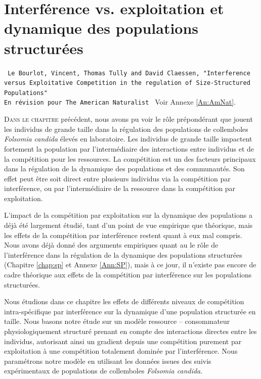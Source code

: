 \chapter[Interférence vs. exploitation et dynamique des populations
structurées][Interférence et populations structurées]{Interférence vs.
exploitation et dynamique des populations structurées}
\label{chap:amnat}

\vspace{2cm}
\begin{Spacing}{1}
\texttt{
Le Bourlot, Vincent, Thomas Tully and David Claessen, "Interference versus
Exploitative Competition in the regulation of Size-Structured Populations"\\
En révision pour The American Naturalist
}
Voir Annexe \ref{An:AmNat}.
\end{Spacing}
\vspace{2cm}


\lettrine[lines=3]{D}{ans le chapitre} précédent, nous avons pu voir le rôle
prépondérant que jouent les individus de grande taille dans la régulation des
populations de collemboles \textit{Folsomia candida} élevés en laboratoire. Les
individus de grande taille impactent fortement la population par l'intermédiaire
des interactions entre individus et de la compétition pour les ressources. La
compétition est un des facteurs principaux dans la régulation de la dynamique
des populations et des communautés. Son effet peut être soit direct entre
plusieurs individus via la compétition par interférence, ou par l'intermédiaire
de la ressource dans la compétition par exploitation.

L'impact de la compétition par exploitation sur la dynamique des populations a
déjà été largement étudié, tant d'un point de vue empirique que théorique, mais
les effets de la compétition par interférence restent quant à eux mal compris.
Nous avons déjà donné des arguments empiriques quant au le rôle de
l'interférence dans la régulation de la dynamique des populations structurées
(Chapitre \ref{chap:sp} et Annexe \ref{Ann:SP}), mais à ce jour, il n'existe pas
encore de cadre théorique aux effets de la compétition par interférence sur les populations structurées.

Nous étudions dans ce chapitre les effets de différents niveaux de compétition
intra-spécifique par interférence sur la dynamique d'une population structurée
en taille. Nous basons notre étude sur un modèle ressource -- consommateur
physiologiquement structuré \autocites[modèle de ][]{kooijman1984a} prenant
en compte des interactions directes entre les individus, autorisant ainsi un
gradient depuis une compétition purement par exploitation à une compétition
totalement dominée par l'interférence. Nous paramétrons notre modèle en
utilisant les données issues des suivis expérimentaux de populations de
collemboles \textit{Folsomia candida}.

